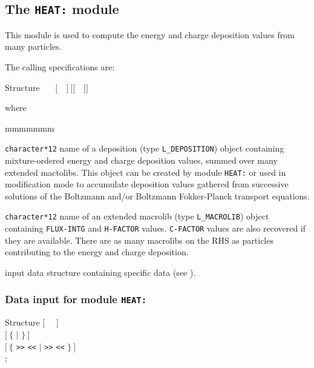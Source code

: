 \subsection{The {\tt HEAT:} module}\label{sect:HEATData}

This module is used to compute the energy and charge deposition values from many particles.

\vskip 0.02cm

The calling specifications are:

\begin{DataStructure}{Structure }
~\moc{:=}~~$[$~~$]~[[$~~$]]$ \moc{::}  \\
\end{DataStructure}

\noindent where
\begin{ListeDeDescription}{mmmmmmm}

\item[\dusa{DEPOS}] {\tt character*12} name of a {\sc deposition} (type {\tt L\_DEPOSITION}) object containing mixture-ordered energy and charge deposition values, summed over many extended mactolibs. This object can be created by module {\tt HEAT:} or used in modification mode to
accumulate deposition values gathered from successive solutions of the Boltzmann and/or Boltzmann Fokker-Planck transport equations.

\item[\dusa{MACRO}] {\tt character*12} name of an extended {\sc macrolib} (type {\tt L\_MACROLIB}) object containing {\tt FLUX-INTG} and {\tt H-FACTOR} values.
{\tt C-FACTOR} values are also recovered if they are available. There are as many macrolibs on the RHS as particles contributing to the energy and charge deposition.

\item[\dusa{HEAT\_data}] input data structure containing specific data (see ).

\end{ListeDeDescription}

\subsubsection{Data input for module {\tt HEAT:}}\label{sect:descHEAT}

\vskip -0.5cm

\begin{DataStructure}{Structure }
$[$~ ~$]$ \\
$[~\{$   $|$   $\}~]$ \\
$[~\{$   {\tt >>}  {\tt <<} $|$   {\tt >>}  {\tt <<} $\}~]$ \\
;
\end{DataStructure}

